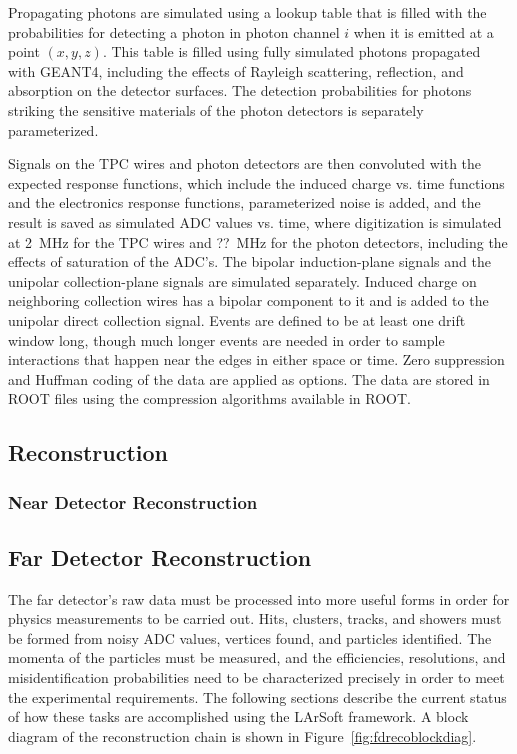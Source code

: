 Propagating photons are simulated using a lookup table that is filled
with the probabilities for detecting a photon in photon channel $i$
when it is emitted at a point $(x,y,z)$.  This table is filled using
fully simulated photons propagated with GEANT4, including the effects
of Rayleigh scattering, reflection, and absorption on the detector
surfaces.  The detection probabilities for photons striking the
sensitive materials of the photon detectors is separately
parameterized.

Signals on the TPC wires and photon detectors are then convoluted with
the expected response functions, which include the induced charge
vs. time functions and the electronics response functions,
parameterized noise is added, and the result is saved as simulated ADC
values vs. time, where digitization is simulated at 2~MHz for the TPC
wires and ??~MHz for the photon detectors, including the effects of
saturation of the ADC's.  The bipolar induction-plane signals and the
unipolar collection-plane signals are simulated separately.  Induced
charge on neighboring collection wires has a bipolar component to it
and is added to the unipolar direct collection signal.  Events are
defined to be at least one drift window long, though much longer
events are needed in order to sample interactions that happen near the
edges in either space or time.  Zero suppression and Huffman coding of
the data are applied as options.  The data are stored in ROOT files
using the compression algorithms available in ROOT.


\subsection{Reconstruction}
\label{sec:detectors-sc-physics-software-reco}

\subsubsection{Near Detector Reconstruction}
\label{sec:detectors-sc-physics-software-reconstruction-nd}

\subsection{Far Detector Reconstruction}
\label{sec:detectors-sc-physics-software-reconstruction-fd}

The far detector's raw data must be processed into more useful forms
in order for physics measurements to be carried out.  Hits, clusters,
tracks, and showers must be formed from noisy ADC values, vertices
found, and particles identified.  The momenta of the particles must be
measured, and the efficiencies, resolutions, and misidentification
probabilities need to be characterized precisely in order to meet the
experimental requirements.  The following sections describe the
current status of how these tasks are accomplished using the LArSoft
framework.  A block diagram of the reconstruction chain is shown in
Figure~\ref{fig:fdrecoblockdiag}.

